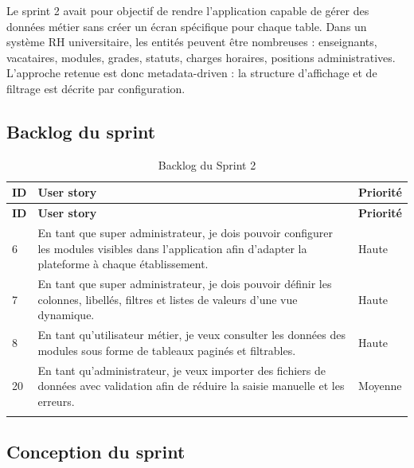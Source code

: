 Le sprint 2 avait pour objectif de rendre l'application capable de gérer des données métier sans créer un écran spécifique pour chaque table. Dans un système RH universitaire, les entités peuvent être nombreuses : enseignants, vacataires, modules, grades, statuts, charges horaires, positions administratives. L'approche retenue est donc metadata-driven : la structure d'affichage et de filtrage est décrite par configuration.

\subsection{Backlog du sprint}

\renewcommand{\arraystretch}{1.4}

\begin{longtable}{|>{\centering\arraybackslash}p{1cm}|
                  >{\raggedright\arraybackslash}p{10.4cm}|
                  >{\centering\arraybackslash}p{1.7cm}|}
\hline
\textbf{ID} & \textbf{User story} & \textbf{Priorité} \\
\hline
\endfirsthead

\hline
\textbf{ID} & \textbf{User story} & \textbf{Priorité} \\
\hline
\endhead

6 & En tant que super administrateur, je dois pouvoir configurer les modules visibles dans l'application afin d'adapter la plateforme à chaque établissement. & Haute \\
\hline

7 & En tant que super administrateur, je dois pouvoir définir les colonnes, libellés, filtres et listes de valeurs d'une vue dynamique. & Haute \\
\hline

8 & En tant qu'utilisateur métier, je veux consulter les données des modules sous forme de tableaux paginés et filtrables. & Haute \\
\hline

20 & En tant qu'administrateur, je veux importer des fichiers de données avec validation afin de réduire la saisie manuelle et les erreurs. & Moyenne \\
\hline

\caption{Backlog du Sprint 2}
\label{tab:backlog_sprint2}

\end{longtable}

\subsection{Conception du sprint}

